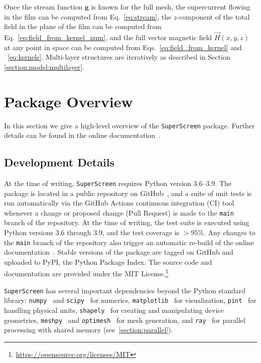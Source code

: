 \documentclass[final,3p,times,twocolumn]{elsarticle}
\newcommand{\inline}[1]{\texttt{#1}\xspace}
\newcommand{\SuperScreen}{\inline{SuperScreen}}
\begin{document}
Once the stream function $\mathbf{g}$ is known for the full mesh,
the supercurrent flowing in the film can be computed from Eq.~\ref{eq:stream}, the $z$-component of the total field in the plane of the film can be computed
from Eq.~\ref{eq:field_from_kernel_num}, and the full vector magnetic field $\vec{H}(x, y, z)$
at any point in space can be computed from Eqs.~\ref{eq:field_from_kernel} and ~\ref{eq:kernels}. Multi-layer structures are  iteratively as described in Section \ref{section:model:multilayer}.

\section{Package Overview}
\label{section:overview}

In this section we give a high-level overview of the \SuperScreen package. Further details can be found in the online documentation~\cite{superscreen-rtd}.

\subsection{Development Details}
\label{section:overview:development}

At the time of writing, \SuperScreen requires Python version 3.6--3.9. The package is located in a public repository on GitHub~\cite{superscreen, BishopVanHorn2021-bd}, and a suite of unit tests is run automatically via the GitHub Actions continuous integration (CI) tool whenever a change or proposed change (Pull Request) is made to the \inline{main} branch of the repository. At the time of writing, the test suite is executed using Python versions 3.6 through 3.9, and the test coverage is $>95\%$. Any changes to the \inline{main} branch of the repository also trigger an automatic re-build of the online documentation~\cite{superscreen-rtd}. Stable versions of the package are tagged on GitHub and uploaded to PyPI, the Python Package Index. The source code and documentation are provided under the MIT License.\footnote{\href{https://opensource.org/licenses/MIT}{https://opensource.org/licenses/MIT}}

\SuperScreen has several important dependencies beyond the Python standard library: \inline{numpy}~\cite{Harris2020-xv} and \inline{scipy}~\cite{Virtanen2020-zz} for numerics, \inline{matplotlib}~\cite{Hunter2007-il} for visualization, \inline{pint}~\cite{Grecco} for handling physical units, \inline{shapely}~\cite{shapely} for creating and manipulating device geometries, \inline{meshpy}~\cite{Klockner, Shewchuk, Shewchuk1996-va} and \inline{optimesh}~\cite{Schlomer2021-ua} for mesh generation, and \inline{ray}~\cite{Moritz2018-mt,ray-docs} for parallel processing with shared memory (see~\ref{section:parallel}).
\end{document}
